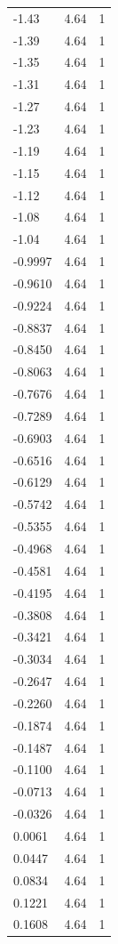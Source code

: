 \begin{longtable}{lrr}
  -1.43 & 4.64 & 1 \\
  -1.39 & 4.64 & 1 \\
  -1.35 & 4.64 & 1 \\
  -1.31 & 4.64 & 1 \\
  -1.27 & 4.64 & 1 \\
  -1.23 & 4.64 & 1 \\
  -1.19 & 4.64 & 1 \\
  -1.15 & 4.64 & 1 \\
  -1.12 & 4.64 & 1 \\
  -1.08 & 4.64 & 1 \\
  -1.04 & 4.64 & 1 \\
  -0.9997 & 4.64 & 1 \\
  -0.9610 & 4.64 & 1 \\
  -0.9224 & 4.64 & 1 \\
  -0.8837 & 4.64 & 1 \\
  -0.8450 & 4.64 & 1 \\
  -0.8063 & 4.64 & 1 \\
  -0.7676 & 4.64 & 1 \\
  -0.7289 & 4.64 & 1 \\
  -0.6903 & 4.64 & 1 \\
  -0.6516 & 4.64 & 1 \\
  -0.6129 & 4.64 & 1 \\
  -0.5742 & 4.64 & 1 \\
  -0.5355 & 4.64 & 1 \\
  -0.4968 & 4.64 & 1 \\
  -0.4581 & 4.64 & 1 \\
  -0.4195 & 4.64 & 1 \\
  -0.3808 & 4.64 & 1 \\
  -0.3421 & 4.64 & 1 \\
  -0.3034 & 4.64 & 1 \\
  -0.2647 & 4.64 & 1 \\
  -0.2260 & 4.64 & 1 \\
  -0.1874 & 4.64 & 1 \\
  -0.1487 & 4.64 & 1 \\
  -0.1100 & 4.64 & 1 \\
  -0.0713 & 4.64 & 1 \\
  -0.0326 & 4.64 & 1 \\
  0.0061 & 4.64 & 1 \\
  0.0447 & 4.64 & 1 \\
  0.0834 & 4.64 & 1 \\
  0.1221 & 4.64 & 1 \\
  0.1608 & 4.64 & 1 \\

\end{longtable}
